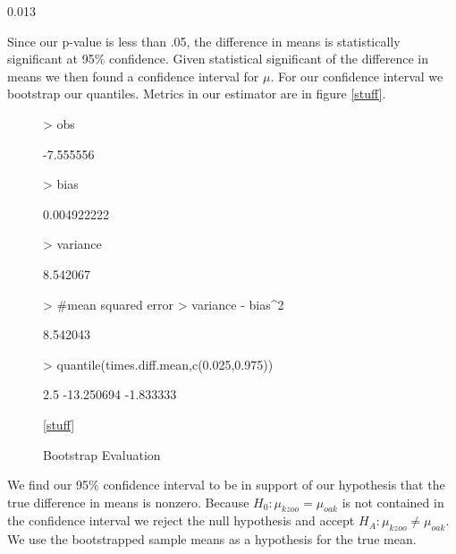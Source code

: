 \documentclass{article}
\begin{document}
\begin{Schunk}
\begin{Soutput}
[1] 0.013
\end{Soutput}
\end{Schunk}

Since our p-value is less than .05, the difference in means is statistically significant at 95\% confidence. Given statistical significant of the difference in means we then found a confidence interval for $\mu$. For our confidence interval we bootstrap our quantiles. Metrics in our estimator are in figure \ref{stuff}.

\begin{figure}
\caption{Bootstrap Evaluation}
\begin{Schunk}
\begin{Sinput}
> obs
\end{Sinput}
\begin{Soutput}
[1] -7.555556
\end{Soutput}
\begin{Sinput}
> bias
\end{Sinput}
\begin{Soutput}
[1] 0.004922222
\end{Soutput}
\begin{Sinput}
> variance
\end{Sinput}
\begin{Soutput}
[1] 8.542067
\end{Soutput}
\begin{Sinput}
> #mean squared error
> variance - bias^2
\end{Sinput}
\begin{Soutput}
[1] 8.542043
\end{Soutput}
\begin{Sinput}
> quantile(times.diff.mean,c(0.025,0.975))
\end{Sinput}
\begin{Soutput}
      2.5%
-13.250694  -1.833333 
\end{Soutput}
\end{Schunk}
\ref{stuff}
\end{figure}

We find our 95\% confidence interval to be in support of our hypothesis that the true difference in means is nonzero. Because $H_0: \mu_{kzoo} = \mu_{oak}$  is not contained in the confidence interval we reject the null hypothesis and accept $H_A: \mu_{kzoo} \ne \mu_{oak}$. We use the bootstrapped sample means as a hypothesis for the true mean.
\end{document}

